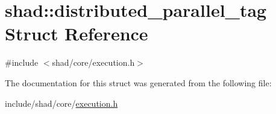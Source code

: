 \hypertarget{structshad_1_1distributed__parallel__tag}{\section{shad\-:\-:distributed\-\_\-parallel\-\_\-tag Struct Reference}
\label{structshad_1_1distributed__parallel__tag}
}


{\ttfamily \#include $<$shad/core/execution.\-h$>$}



The documentation for this struct was generated from the following file\-:\begin{DoxyCompactItemize}
\item 
include/shad/core/\hyperlink{execution_8h}{execution.\-h}\end{DoxyCompactItemize}
